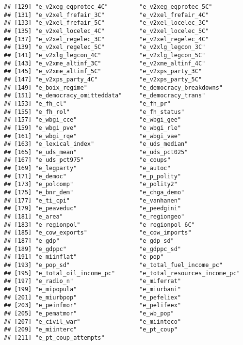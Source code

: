 \documentclass[
]{article}
\begin{document}
\begin{verbatim}
## [129] "e_v2xeg_eqprotec_4C"         "e_v2xeg_eqprotec_5C"        
## [131] "e_v2xel_frefair_3C"          "e_v2xel_frefair_4C"         
## [133] "e_v2xel_frefair_5C"          "e_v2xel_locelec_3C"         
## [135] "e_v2xel_locelec_4C"          "e_v2xel_locelec_5C"         
## [137] "e_v2xel_regelec_3C"          "e_v2xel_regelec_4C"         
## [139] "e_v2xel_regelec_5C"          "e_v2xlg_legcon_3C"          
## [141] "e_v2xlg_legcon_4C"           "e_v2xlg_legcon_5C"          
## [143] "e_v2xme_altinf_3C"           "e_v2xme_altinf_4C"          
## [145] "e_v2xme_altinf_5C"           "e_v2xps_party_3C"           
## [147] "e_v2xps_party_4C"            "e_v2xps_party_5C"           
## [149] "e_boix_regime"               "e_democracy_breakdowns"     
## [151] "e_democracy_omitteddata"     "e_democracy_trans"          
## [153] "e_fh_cl"                     "e_fh_pr"                    
## [155] "e_fh_rol"                    "e_fh_status"                
## [157] "e_wbgi_cce"                  "e_wbgi_gee"                 
## [159] "e_wbgi_pve"                  "e_wbgi_rle"                 
## [161] "e_wbgi_rqe"                  "e_wbgi_vae"                 
## [163] "e_lexical_index"             "e_uds_median"               
## [165] "e_uds_mean"                  "e_uds_pct025"               
## [167] "e_uds_pct975"                "e_coups"                    
## [169] "e_legparty"                  "e_autoc"                    
## [171] "e_democ"                     "e_p_polity"                 
## [173] "e_polcomp"                   "e_polity2"                  
## [175] "e_bnr_dem"                   "e_chga_demo"                
## [177] "e_ti_cpi"                    "e_vanhanen"                 
## [179] "e_peaveduc"                  "e_peedgini"                 
## [181] "e_area"                      "e_regiongeo"                
## [183] "e_regionpol"                 "e_regionpol_6C"             
## [185] "e_cow_exports"               "e_cow_imports"              
## [187] "e_gdp"                       "e_gdp_sd"                   
## [189] "e_gdppc"                     "e_gdppc_sd"                 
## [191] "e_miinflat"                  "e_pop"                      
## [193] "e_pop_sd"                    "e_total_fuel_income_pc"     
## [195] "e_total_oil_income_pc"       "e_total_resources_income_pc"
## [197] "e_radio_n"                   "e_miferrat"                 
## [199] "e_mipopula"                  "e_miurbani"                 
## [201] "e_miurbpop"                  "e_pefeliex"                 
## [203] "e_peinfmor"                  "e_pelifeex"                 
## [205] "e_pematmor"                  "e_wb_pop"                   
## [207] "e_civil_war"                 "e_miinteco"                 
## [209] "e_miinterc"                  "e_pt_coup"                  
## [211] "e_pt_coup_attempts"
\end{verbatim}
\end{document}
